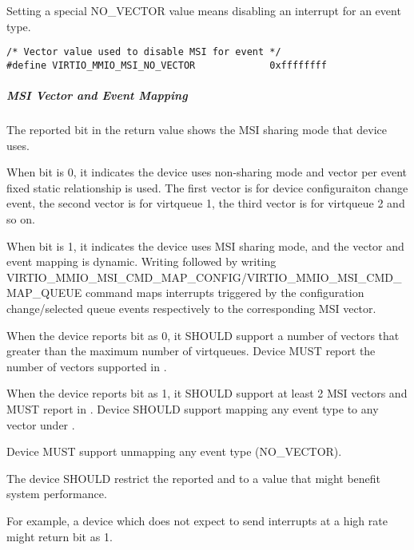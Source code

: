 Setting a special NO_VECTOR value means disabling an interrupt for an event type.

\begin{lstlisting}
/* Vector value used to disable MSI for event */
#define VIRTIO_MMIO_MSI_NO_VECTOR             0xffffffff
\end{lstlisting}

\subparagraph{MSI Vector and Event Mapping}\label{sec:Virtio Transport Options / Virtio Over MMIO / MMIO-specific Initialization And Device Operation / Device Initialization / MSI Vector Configuration}
The reported  bit in the  return value shows
the MSI sharing mode that device uses.

When  bit is 0, it indicates the device uses non-sharing mode
and vector per event fixed static relationship is used. The first vector is for device
configuraiton change event, the second vector is for virtqueue 1, the third vector
is for virtqueue 2 and so on.

When  bit is 1, it indicates the device uses MSI sharing mode,
and the vector and event mapping is dynamic. Writing 
followed by writing VIRTIO_MMIO_MSI_CMD_MAP_CONFIG/VIRTIO_MMIO_MSI_CMD_MAP_QUEUE command
maps interrupts triggered by the configuration change/selected queue events respectively
to the corresponding MSI vector.


When the device reports  bit as 0, it SHOULD support a number of
vectors that greater than the maximum number of virtqueues.
Device MUST report the number of vectors supported in .

When the device reports  bit as 1, it SHOULD support at least
2 MSI vectors and MUST report in . Device SHOULD support mapping any
event type to any vector under .

Device MUST support unmapping any event type (NO_VECTOR).

The device SHOULD restrict the reported  and 
to a value that might benefit system performance.

\begin{note}
For example, a device which does not expect to send interrupts at a high rate might
return  bit as 1.
\end{note}

